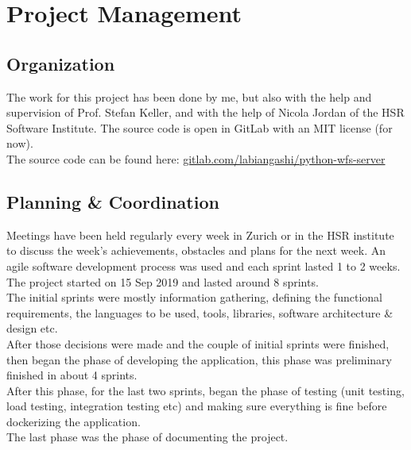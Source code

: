 \chapter{Project Management}
\section{Organization}
The work for this project has been done by me, but also with the help and supervision of Prof. Stefan Keller, and with the help of Nicola Jordan of the HSR Software Institute.
The source code is open in GitLab with an MIT license (for now).\\
The source code can be found here: \href{https://gitlab.com/labiangashi/python-wfs-server}{gitlab.com/labiangashi/python-wfs-server}
\section{Planning \& Coordination}
Meetings have been held regularly every week in Zurich or in the HSR institute to discuss the week's achievements, obstacles and plans for the next week. An agile software development process was used and each sprint lasted 1 to 2 weeks.
The project started on 15 Sep 2019 and lasted around 8 sprints.\\
\newline
The initial sprints were mostly information gathering, defining the functional requirements, the languages to be used, tools, libraries, software architecture \& design etc.\\
After those decisions were made and the couple of initial sprints were finished, then began the phase of developing the application, this phase was preliminary finished in about 4 sprints.\\
After this phase, for the last two sprints, began the phase of testing (unit testing, load testing, integration testing etc) and making sure everything is fine before dockerizing the application.\\
The last phase was the phase of documenting the project.
